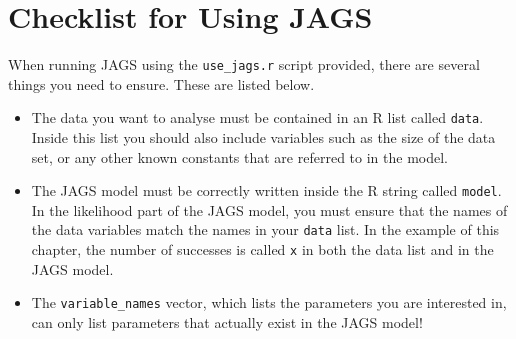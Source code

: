 \section{Checklist for Using JAGS}
When running JAGS using the {\tt use\_jags.r} script provided, there are several
things you need to ensure. These are listed below.

\begin{itemize}
\item The data you want to analyse must be contained in an R
list called {\tt data}. Inside this list you should also include variables
such as the size of the data set, or any other known constants that are
referred to in the model.
\item The JAGS model must be correctly written inside the R string called
{\tt model}. In the likelihood part of the JAGS model, you must ensure that
the names of the data variables match the names in your {\tt data} list. In
the example of this chapter, the number of successes is called {\tt x} in both
the data list and in the JAGS model.
\item The {\tt variable\_names} vector, which lists the parameters you are
interested in, can only list parameters that actually exist in the JAGS model!
\end{itemize}
